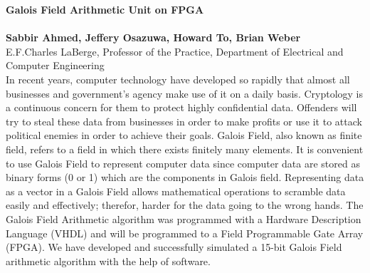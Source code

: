 \documentclass{article}
\begin{document}
	\noindent
	\textbf{Galois Field Arithmetic Unit on FPGA} 
	\\
	\\
	\textbf{Sabbir Ahmed, Jeffery Osazuwa, Howard To, Brian Weber}
	\\
	E.F.Charles LaBerge, Professor of the Practice, Department of Electrical and Computer Engineering 
	\\
	
	
\noindent	
	In recent years, computer technology have developed so rapidly that almost all businesses and government's agency make use of it on a daily basis. Cryptology is a continuous concern for them to protect highly confidential data. Offenders will try to steal these data from businesses in order to make profits or use it to attack political enemies in order to achieve their goals. Galois Field, also known as finite field, refers to a field in which there exists finitely many elements. It is convenient to use Galois Field to represent computer data since computer data are stored as binary forms (0 or 1) which are the components in Galois field. Representing data as a vector in a Galois Field allows mathematical operations to scramble data easily and effectively; therefor, harder for the data going to the wrong hands. The Galois Field Arithmetic algorithm was programmed with a Hardware Description Language (VHDL) and will be programmed to a Field Programmable Gate Array (FPGA). We have developed and successfully simulated a 15-bit Galois Field  arithmetic algorithm with the help of software.    \\
	
	
\end{document}
